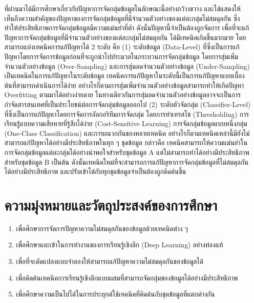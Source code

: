ที่ผ่านมาได้มีการศึกษาเกี่ยวกับปัญหาการจัดกลุ่มข้อมูลในลักษณะนี้อย่างกว้างขวาง และได้แสดงให้เห็นถึงความสำคัญของปัญหาของการจัดกลุ่มข้อมูลที่มีจำนวนตัวอย่างของแต่ละกลุ่มไม่สมดุลกัน ซึ่งทำให้ประสิทธิภาพการจัดกลุ่มข้อมูลมีความแม่นยำที่ต่ำ ดังนั้นปัญหานี้จำเป็นต้องถูกจัดการ \cite{Buda:2017} เพื่อที่จะแก้ปัญหาการจัดกลุ่มข้อมูลที่มีจำนวนตัวอย่างของแต่ละกลุ่มไม่สมดุลกัน ได้มีเทคนิคเกิดขึ้นมากมาย โดยสามารถแบ่งเทคนิคการแก้ปัญหาได้ 2 ระดับ คือ (1) ระดับข้อมูล (Data-Level) ที่ซึ่งเป็นการแก้ปัญหาโดยการจัดการข้อมูลก่อนที่จะถูกนำไปประมวลในกระบวนการจัดกลุ่มข้อมูล โดยการสุ่มเพิ่มจำนวนตัวอย่างข้อมูล (Over-Sampling) และการสุ่มลดจำนวนตัวอย่างข้อมูล (Under-Sampling) เป็นเทคนิคในการแก้ปัญหาในระดับข้อมูล เทคนิคการแก้ปัญหาในระดับนี้เป็นการแก้ปัญหาแบบเบื้องต้นที่สามารถดำเนินการได้ง่าย อย่างไรก็ตามการสุ่มเพิ่มจำนวนตัวอย่างข้อมูลสามารถทำให้เกิดปัญหา Overfitting ตามมาได้อย่างง่ายดาย ในทางเดียวกันการสุ่มลดจำนวนตัวอย่างข้อมูลอาจจะเป็นการกำจัดสารสนเทศที่เป็นประโยชน์ต่อการจัดกลุ่มข้อมูลออกไป (2) ระดับตัวจัดกลุ่ม (Classifier-Level) ที่ซึ่งเป็นการแก้ปัญหาโดยการจัดการอัลกอริทึมการจัดกลุ่ม โดยการทำเทรสโช (Thresholding) การเรียนรู้แบบความเสียหายที่รู้สึกได้ง่าย (Cost-Sensitive Learning) การจัดกลุ่มข้อมูลแบบหนึ่งกลุ่ม (One-Class Classification) และการผนวกกันของหลายเทคนิค อย่างไรก็ตามเทคนิคเหล่านี้มียังไม่สามารถแก้ปัญหาได้อย่างมีประสิทธิภาพในทุก ๆ ชุดข้อมูล กล่าวคือ เทคนิคสามารถให้ความแม่นยำในการจัดกลุ่มข้อมูลแต่ละกลุ่มได้อย่างน่าพอใจสำหรับชุดข้อมูล A แต่ไม่สามารถทำได้อย่างมีประสิทธิภาพสำหรับชุดข้อมูล B เป็นต้น ดังนั้นเทคนิคใหม่ที่จะสามารถการแก้ปัญหาการจัดกลุ่มข้อมูลที่ไม่สมดุลกันได้อย่างมีประสิทธิภาพ และปรับเข้าได้กับทุกชุดข้อมูลจำเป็นต้องถูกคิดค้นขึ้น

\section{ความมุ่งหมายและวัตถุประสงค์ของการศึกษา}
\begin{enumerate}
	\item เพื่อศึกษาการจัดการปัญหาความไม่สมดุลกันของข้อมูลด้วยเทคนิคต่าง ๆ
	\item เพื่อศึกษาและเข้าในการทำงานของการเรียนรู้เชิงลึก (Deep Learning) อย่างท่องแท้
	\item เพื่อที่จะดัดแปลงแบบจำลองให้สามารถแก้ปัญหาความไม่สมดุลกันของข้อมูลได้
	\item เพื่อคิดค้นเทคนิคการเรียนรู้เชิงลึกแบบผสมที่สามารถจัดกลุ่มของข้อมูลได้อย่างมีประสิทธิภาพ
	\item เพื่อศึกษาความเป็นไปได้ในการประยุกต์ใช้เทคนิคที่คิดค้นกับชุดข้อมูลที่แตกต่างกัน
\end{enumerate}
